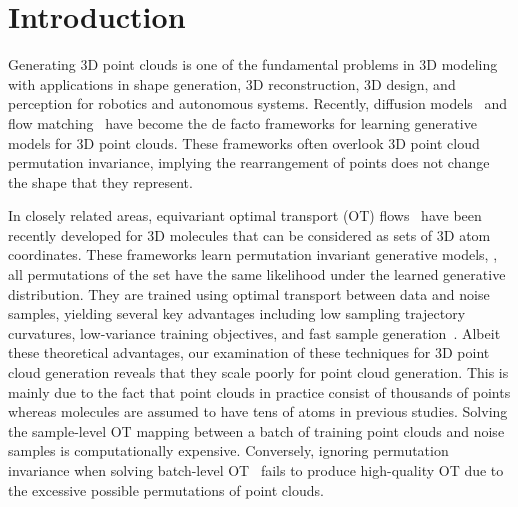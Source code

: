 \vspace{-3mm}
\section{Introduction}
\vspace{-1mm}


Generating 3D point clouds is one of the fundamental problems in 3D modeling with applications in shape generation, 3D reconstruction, 3D design, and perception for robotics and autonomous systems. Recently, diffusion models~\cite{sohl2015deep,ho2020denoising} and flow matching~\cite{lipman2022flow} have become the de facto frameworks for learning generative models for 3D point clouds.
%
%
These frameworks often overlook 3D point cloud permutation invariance, implying the rearrangement of points does not change the shape that they represent.

In closely related areas, equivariant optimal transport (OT) flows~\cite{klein2024equivariant,song2024equivariant} have been recently developed for 3D molecules that can be considered as sets of 3D atom coordinates. 
These frameworks learn permutation invariant generative models, \ie, all permutations of the set have the same likelihood under the learned generative distribution.
They are trained using optimal transport between data and noise samples, yielding several key advantages including low sampling trajectory curvatures, low-variance training objectives, and fast sample generation~\cite{pooladian2023multisample}.
Albeit these theoretical advantages, our examination of these techniques for 3D point cloud generation reveals that they scale poorly for point cloud generation.
This is mainly due to the fact that point clouds in practice consist of thousands of points whereas molecules are assumed to have tens of atoms in previous studies.
Solving the sample-level OT mapping between a batch of training point clouds and noise samples is computationally expensive.
Conversely, ignoring permutation invariance when solving batch-level OT~\cite{pooladian2023multisample,tong2023improving} fails to produce high-quality OT due to the excessive possible permutations of point clouds.

